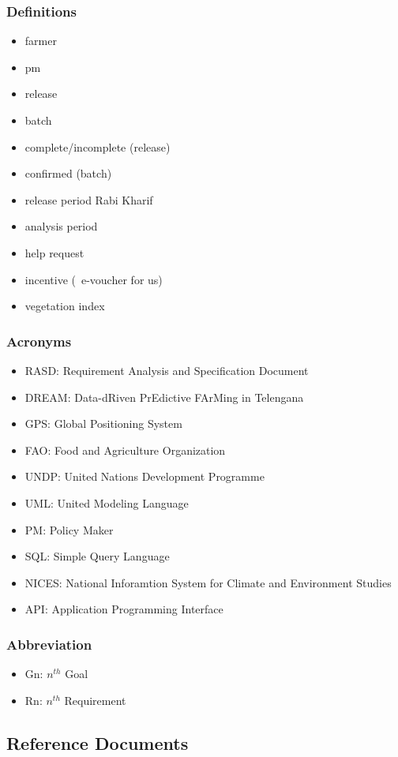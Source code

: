 \subsubsection{Definitions}
\begin{itemize}
	\item farmer
	\item pm
	\item release
	\item batch
	\item complete/incomplete (release)
	\item confirmed (batch)
	\item release period
	\subitem Rabi
	\subitem Kharif
	\item analysis period
	\item help request
	\item incentive (~e-voucher for us)
	\item vegetation index
\end{itemize}

\subsubsection{Acronyms}
\begin{itemize}
	\item RASD: Requirement Analysis and Specification Document
	\item DREAM: Data-dRiven PrEdictive FArMing in
Telengana
	\item GPS: Global Positioning System
	\item FAO: Food and Agriculture Organization
	\item UNDP: United Nations Development Programme
	\item UML: United Modeling Language
	\item PM: Policy Maker
	\item SQL: Simple Query Language
	\item NICES: National Inforamtion System for Climate and Environment Studies
	\item API: Application Programming Interface
\end{itemize}

\subsubsection{Abbreviation}
\begin{itemize}
	\item Gn: $n^{th}$ Goal
	\item Rn: $n^{th}$ Requirement
\end{itemize}

\subsection{Reference Documents}
 

